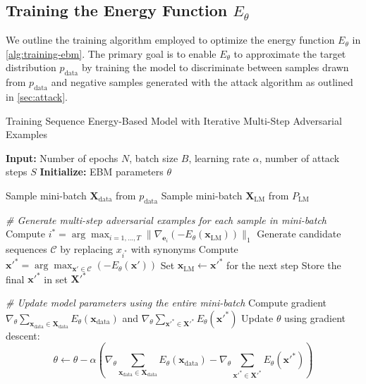 \documentclass{article}
\begin{document}
\subsection{Training the Energy Function \(E_\theta\)}

We outline the training algorithm employed to optimize the energy function \(E_\theta\) in \cref{alg:training-ebm}. The primary goal is to enable \(E_\theta\) to approximate the target distribution \( p_{\text{data}}\) by training the model to discriminate between samples drawn from \( p_{\text{data}} \) and negative samples generated with the attack algorithm as outlined in \cref{sec:attack}. 

  \begin{algorithm}
    \caption{Training Sequence Energy-Based Model with Iterative Multi-Step Adversarial Examples}
    \label{alg:training-ebm}
    \begin{algorithmic}[1]
    \STATE \textbf{Input:} Number of epochs \( N \), batch size \( B \), learning rate \( \alpha \), number of attack steps \( S \)
    \STATE \textbf{Initialize:} EBM parameters \( \theta \)
    
        \STATE Sample mini-batch \( \mathbf{X}_{\text{data}} \) from \( p_{\text{data}} \)
        \STATE Sample mini-batch \( \mathbf{X}_{\text{LM}} \) from \( P_{\text{LM}} \)
            
        \STATE \textit{\# Generate multi-step adversarial examples for each sample in mini-batch}
                \STATE Compute \( i^* = \arg\max_{i=1,...,T} \|\nabla_{\mathbf{e}_i} (-E_\theta(\mathbf{x}_{\text{LM}}))\|_1 \)
                \STATE Generate candidate sequences \( \mathcal{C} \) by replacing \( x_{i^*} \) with synonyms
                \STATE Compute \( \mathbf{x'}^* = \arg\max_{\mathbf{x'} \in \mathcal{C}} (-E_\theta(\mathbf{x'})) \)
                \STATE Set \( \mathbf{x}_{\text{LM}} \leftarrow \mathbf{x'}^* \) for the next step
            \ENDFOR
            \STATE Store the final \( \mathbf{x'}^* \) in set \( \mathbf{X'}^* \)
        \ENDFOR
            
        \STATE \textit{\# Update model parameters using the entire mini-batch}
        \STATE Compute gradient \( \nabla_\theta \sum_{\mathbf{x}_{\text{data}} \in \mathbf{X}_{\text{data}}} E_\theta(\mathbf{x}_{\text{data}}) \) and \( \nabla_\theta \sum_{\mathbf{x'}^* \in \mathbf{X'}^*} E_\theta(\mathbf{x'}^*) \)
        \STATE Update \( \theta \) using gradient descent:
        \[
        \theta \leftarrow \theta - \alpha \left( \nabla_\theta \sum_{\mathbf{x}_{\text{data}} \in \mathbf{X}_{\text{data}}} E_\theta(\mathbf{x}_{\text{data}}) - \nabla_\theta \sum_{\mathbf{x'}^* \in \mathbf{X'}^*} E_\theta(\mathbf{x'}^*) \right)
        \]
    \ENDFOR
    \end{algorithmic}
  \end{algorithm}
  
\end{document}

